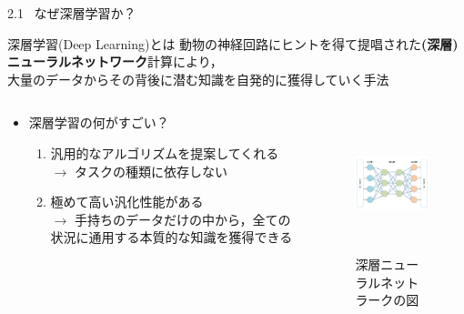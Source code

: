 \documentclass[dvipdfmx,10pt]{beamer}
\begin{document}
  \begin{frame}{2.1 \ なぜ深層学習か？}
    \begin{block}{深層学習(Deep Learning)とは}
      動物の神経回路にヒントを得て提唱された\textbf{(深層)ニューラルネットワーク}計算により，\\
      大量のデータからその背後に潜む知識を自発的に獲得していく手法
    \end{block}
    \begin{columns}
      \begin{column}{0.5\textwidth}
        \begin{itemize}
          \item 深層学習の何がすごい？
          \vspace{0.3cm}
          \begin{enumerate}
            \item 汎用的なアルゴリズムを提案してくれる\\
            $\rightarrow$ タスクの種類に依存しない
            \vspace{0.3cm}
            \item 極めて高い汎化性能がある\\
            $\rightarrow$ 手持ちのデータだけの中から，全ての状況に通用する本質的な知識を獲得できる
          \end{enumerate}
        \end{itemize}
      \end{column}
      \begin{column}{0.5\textwidth}
        \begin{figure}
          \begin{center}
            \includegraphics[height=4cm]{./NN.png}
          \end{center} 
          \caption{深層ニューラルネットラークの図}  
        \end{figure}
      \end{column}
    \end{columns}
    
  \end{frame}
\end{document}
